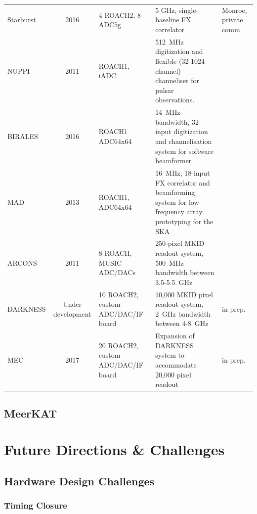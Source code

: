 \documentclass{ws-jai}
\begin{document}
\begin{landscape}
\begin{longtable}{p{3cm} c p{4cm} p{8cm} p{2cm}}
  Starburst        & 2016 & 4 ROACH2, 8 ADC5g & 5 GHz, single-baseline FX correlator & Monroe, private comm \\
  NUPPI            & 2011 & ROACH1, iADC & 512~MHz digitization and flexible (32-1024 channel) channeliser for pulsar observations. & \cite{2014MNRAS.443.3752L} \\
  BIRALES          & 2016 & ROACH1 ADC64x64 & 14~MHz bandwidth, 32-input digitization and channelisation system for software beamformer & \cite{7180719} \\
  MAD              & 2013 & ROACH1, ADC64x64 & 16~MHz, 18-input FX correlator and beamforming system for low-frequency array prototyping for the SKA & \cite{Pupillo2015, RDS:RDS20336} \\
  ARCONS           & 2011 & 8 ROACH, MUSIC ADC/DACs & 250-pixel MKID readout system, 500~MHz bandwidth between 3.5-5.5~GHz & \cite{10.1086/674013} \\
  DARKNESS         & Under development & 10 ROACH2, custom ADC/DAC/IF board & 10,000 MKID pixel readout system, 2~GHz bandwidth between 4-8~GHz & in prep. \\
  MEC              & 2017 & 20 ROACH2, custom ADC/DAC/IF board & Expansion of DARKNESS system to accommodate 20,000 pixel readout & in prep. \\
  
  \end{longtable}
\end{landscape}

\subsection{MeerKAT}


\section{Future Directions \& Challenges} \label{sec:Future}

\subsection{Hardware Design Challenges}

\subsubsection{Timing Closure}
\end{document}
